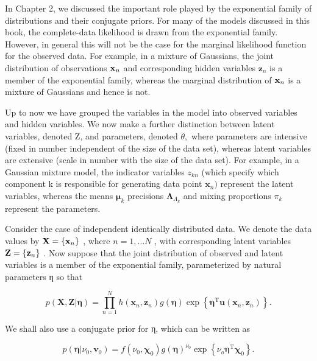 \documentclass[
  10
]{article}
\begin{document}
In Chapter 2, we discussed the important role played by the exponential
family of distributions and their conjugate priors. For many of the
models discussed in this book, the complete-data likelihood is drawn
from the exponential family. However, in general this will not be the
case for the marginal likelihood function for the observed data. For
example, in a mixture of Gaussians, the joint distribution of
observations \({ \bf x } _ { n }\) and corresponding hidden variables
\(\mathbf { z } _ { n }\) is a member of the exponential family, whereas
the marginal distribution of \({ \bf x } _ { n }\) is a mixture of
Gaussians and hence is not.

Up to now we have grouped the variables in the model into observed
variables and hidden variables. We now make a further distinction
between latent variables, denoted Z, and parameters, denoted
\(\theta ,\) where parameters are intensive (fixed in number independent
of the size of the data set), whereas latent variables are extensive
(scale in number with the size of the data set). For example, in a
Gaussian mixture model, the indicator variables \(z _ { k n }\) (which
specify which component k is responsible for generating data point
\(\mathbf { x } _ { n } )\) represent the latent variables, whereas the
means \(\pmb { \mu } _ { k }\) precisions
\(\mathbf { \Lambda } _ { \Lambda _ { k } }\) and mixing proportions
\(\pi _ { k }\) represent the parameters.

Consider the case of independent identically distributed data. We denote
the data values by \({ \bf X } = \{ { \bf x } _ { n } \}\) , where
\(n = 1 , \ldots N\) , with corresponding latent variables
\({ \bf Z } = \{ { \bf z } _ { n } \}\) . Now suppose that the joint
distribution of observed and latent variables is a member of the
exponential family, parameterized by natural parameters η so that

\[
p (\mathbf {X}, \mathbf {Z} | \boldsymbol {\eta}) = \prod_ {n = 1} ^ {N} h (\mathbf {x} _ {n}, \mathbf {z} _ {n}) g (\boldsymbol {\eta}) \exp \left\{\boldsymbol {\eta} ^ {\mathrm{T}} \mathbf {u} (\mathbf {x} _ {n}, \mathbf {z} _ {n}) \right\}.\tag{10.113}
\]

We shall also use a conjugate prior for η, which can be written as

\[
p (\boldsymbol {\eta} | \nu_ {0}, \mathbf {v} _ {0}) = f (\nu_ {0}, \boldsymbol {\chi} _ {0}) g (\boldsymbol {\eta}) ^ {\nu_ {0}} \exp \left\{\nu_ {o} \boldsymbol {\eta} ^ {\mathrm{T}} \boldsymbol {\chi} _ {0} \right\}.\tag{10.114}
\]
\end{document}
